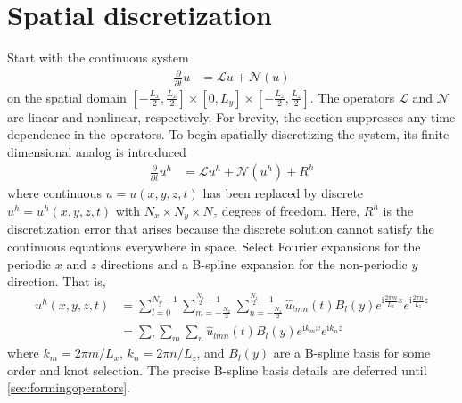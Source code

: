 \documentclass[letterpaper,11pt,nointlimits,reqno,draft]{amsbook}
\newcommand{\ii}{\ensuremath{\mathrm{i}}}
\begin{document}
\section{Spatial discretization}
\label{sec:spatialdiscretization}

Start with the continuous system
\begin{align}
  \frac{\partial}{\partial{}t} u &= \mathscr{L}u + \mathscr{N}\!\left(u\right)
\end{align}
on the spatial domain $\left[-\frac{L_x}{2},\frac{L_x}{2}\right] \times{}
[0,L_y] \times{} \left[-\frac{L_z}{2},\frac{L_z}{2}\right]$.  The operators
$\mathscr{L}$ and $\mathscr{N}$ are linear and nonlinear, respectively.  For
brevity, the section suppresses any time dependence in the operators.  To begin
spatially discretizing the system, its finite dimensional analog is introduced
\begin{align}
  \frac{\partial}{\partial{}t} u^h
  &=
  \mathscr{L}u^h + \mathscr{N}\!\left(u^h\right) + R^h
  \label{eq:discrete_system_with_residual}
\end{align}
where continuous $u = u\!\left(x,y,z,t\right)$ has been replaced by discrete
$u^h = u^h\!\left(x,y,z,t\right)$ with $N_x\times{}N_y\times{}N_z$ degrees of
freedom.  Here, $R^h$ is the discretization error that arises because the
discrete solution cannot satisfy the continuous equations everywhere in space.
Select Fourier expansions for the periodic $x$ and $z$ directions and a
B-spline expansion for the non-periodic $y$ direction.  That is,
\begin{align}
u^h(x,y,z,t)
&=
  \sum_{l=0}^{N_y - 1}
  \sum_{m=-\frac{N_x}{2}}^{\frac{N_x}{2}-1}
  \sum_{n=-\frac{N_z}{2}}^{\frac{N_z}{2}-1}
  \hat{u}_{l m n}(t)
  B_l\!\left(y\right)
  e^{\ii\frac{2\pi{}m}{L_x}x}
  e^{\ii\frac{2\pi{}n}{L_z}z}
  \\
&=
  \sum_{l}\sum_{m}\sum_{n}
  \hat{u}_{l m n}(t)B_l\!\left(y\right)e^{\ii k_m x}e^{\ii k_n z}
  \label{eq:u_h_expansion}
\end{align}
where $k_m = 2\pi{}m/L_x$, $k_n = 2\pi{}n/L_z$, and $B_l\!\left(y\right)$ are a
B-spline basis for some order and knot selection.  The precise B-spline basis
details are deferred until \autoref{sec:formingoperators}.
\end{document}
